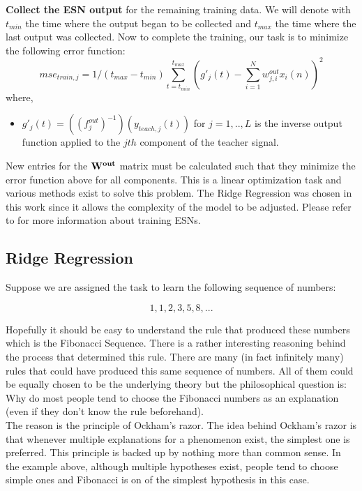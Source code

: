 \documentclass[letterpaper,9pt]{article}
\begin{document}
{\bf Collect the ESN output} for the remaining training data. We will denote with $t_{min}$ the time where the output began to be collected and $t_{max}$ the time where the last output was collected. Now to complete the training, our task is to minimize the following error function:
\[
mse_{train,j} = 1/(t_{max}-t_{min})\sum_{t=t_{min}}^{t_{max}}(g'_j(t) - \sum_{i=1}^{N}w_{j,i}^{out}x_i(n))^2
\]
where, 
\begin{itemize}
  \item $g'_j(t)=((f_j^{out})^{-1})(y_{teach,j}(t))$ for $j=1,..,L$ is the inverse output function applied to the $jth$ component of the teacher signal. 
\end{itemize}

New entries for the ${\bf W^{out}}$ matrix must be calculated such that they minimize the error function above for all components. This is a linear optimization task and various methods exist to solve this problem. The Ridge Regression was chosen in this work since it allows the complexity of the model to be adjusted. Please refer to \cite{JaegerESNTutorial} for more information about training ESNs.

\subsection{Ridge Regression}

Suppose we are assigned the task to learn the following sequence of numbers:

\[
  1,1,2,3,5,8,...
\]

Hopefully it should be easy to understand the rule that produced these numbers which is the Fibonacci Sequence. There is a rather interesting reasoning behind the process that determined this rule. There are many (in fact infinitely many) rules that could have produced this same sequence of numbers. All of them could be equally chosen to be the underlying theory but the philosophical question is: Why do most people tend to choose the Fibonacci numbers as an explanation (even if they don't know the rule beforehand).\\

The reason is the principle of Ockham's razor. The idea behind Ockham's razor is that whenever multiple explanations for a phenomenon exist, the simplest one is preferred. This principle is backed up by nothing more than common sense. In the example above, although multiple hypotheses exist, people tend to choose simple ones and Fibonacci is on of the simplest hypothesis in this case.\\
\end{document}
